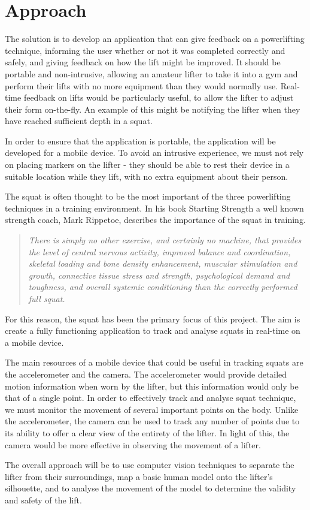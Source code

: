 \section{Approach}

The solution is to develop an application that can give feedback on a powerlifting technique, informing the user whether or not it was completed correctly and safely, and giving feedback on how the lift might be improved. It should be portable and non-intrusive, allowing an amateur lifter to take it into a gym and perform their lifts with no more equipment than they would normally use. Real-time feedback on lifts would be particularly useful, to allow the lifter to adjust their form on-the-fly. An example of this might be notifying the lifter when they have reached sufficient depth in a squat.

In order to ensure that the application is portable, the application will be developed for a mobile device. To avoid an intrusive experience, we must not rely on placing markers on the lifter - they should be able to rest their device in a suitable location while they lift, with no extra equipment about their person.

The squat is often thought to be the most important of the three powerlifting techniques in a training environment. In his book Starting Strength\cite{startingstrength} a well known strength coach, Mark Rippetoe, describes the importance of the squat in training.

\begin{quote}
\emph{There is simply no other exercise, and certainly no machine, that provides the level of central nervous activity, improved balance and coordination, skeletal loading and bone density enhancement, muscular stimulation and growth, connective tissue stress and strength, psychological demand and toughness, and overall systemic conditioning than the correctly performed full squat.}
\end{quote}

For this reason, the squat has been the primary focus of this project. The aim is create a fully functioning application to track and analyse squats in real-time on a mobile device.

The main resources of a mobile device that could be useful in tracking squats are the accelerometer and the camera. The accelerometer would provide detailed motion information when worn by the lifter, but this information would only be that of a single point. In order to effectively track and analyse squat technique, we must monitor the movement of several important points on the body. Unlike the accelerometer, the camera can be used to track any number of points due to its ability to offer a clear view of the entirety of the lifter. In light of this, the camera would be more effective in observing the movement of a lifter.

The overall approach will be to use computer vision techniques to separate the lifter from their surroundings, map a basic human model onto the lifter's silhouette, and to analyse the movement of the model to determine the validity and safety of the lift.
